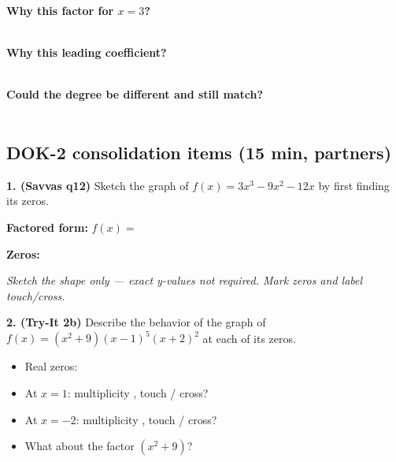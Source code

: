 \documentclass[11pt]{article}
\newcommand{\framedline}[1]{\underline{\hspace{#1}}}
\newcommand{\frameblank}{\underline{\hspace{4em}}}
\begin{document}
\vspace{3pt}
\textbf{Why this factor for $x = 3$?} \\
\framedline{5.5in} \\[5pt]
\framedline{5.5in}

\vspace{3pt}
\textbf{Why this leading coefficient?} \\
\framedline{5.5in} \\[5pt]
\framedline{5.5in}

\vspace{3pt}
\textbf{Could the degree be different and still match?} \\
\framedline{5.5in} \\[5pt]
\framedline{5.5in}

\subsection*{DOK-2 consolidation items (15 min, partners)}

\noindent\begin{minipage}{\textwidth}
\textbf{1. (Savvas q12)} Sketch the graph of $f(x) = 3x^3 - 9x^2 - 12x$ by first finding its zeros.

\textbf{Factored form:} $f(x) = $ \framedline{4in}

\vspace{3pt}
\textbf{Zeros:} \framedline{4in}

\begin{center}
\end{center}
{\small\textit{Sketch the shape only --- exact y-values not required. Mark zeros and label touch/cross.}}
\end{minipage}

\vspace{0.5em}

\textbf{2. (Try-It 2b)} Describe the behavior of the graph of $f(x) = (x^2 + 9)(x - 1)^5(x + 2)^2$ at each of its zeros.

\begin{itemize}[leftmargin=*, nosep]
    \item Real zeros: \framedline{4in}
    \item At $x = 1$: multiplicity \frameblank, \quad touch / cross? \framedline{2.5in}
    \item At $x = -2$: multiplicity \frameblank, \quad touch / cross? \framedline{2.5in}
    \item What about the factor $(x^2 + 9)$? \\
    \framedline{5.5in} \\[5pt]
    \framedline{5.5in} \\[5pt]
    \framedline{5.5in}
\end{itemize}
\end{document}
